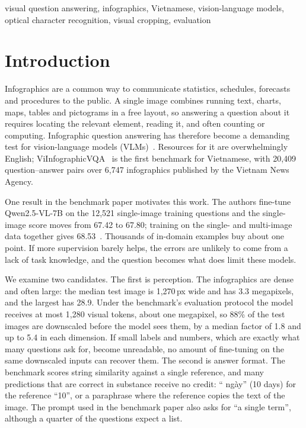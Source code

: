 \documentclass[conference]{IEEEtran}
\newcommand{\vi}[1]{{\fontencoding{T5}\selectfont #1}}
\newcommand{\vi}[1]{#1}
\newcommand{\MedianWidth}{1{,}270}
\newcommand{\MedianMP}{3.3}
\newcommand{\MedianDown}{1.8}
\begin{document}
\begin{IEEEkeywords}
visual question answering, infographics, Vietnamese, vision-language models, optical character recognition, visual cropping, evaluation
\end{IEEEkeywords}

\section{Introduction}
Infographics are a common way to communicate statistics, schedules, forecasts and procedures to the public. A single image combines running text, charts, maps, tables and pictograms in a free layout, so answering a question about it requires locating the relevant element, reading it, and often counting or computing. Infographic question answering has therefore become a demanding test for vision-language models (VLMs)~\cite{infographicvqa}. Resources for it are overwhelmingly English; ViInfographicVQA~\cite{viinfographicvqa} is the first benchmark for Vietnamese, with 20{,}409 question--answer pairs over 6{,}747 infographics published by the Vietnam News Agency.

One result in the benchmark paper motivates this work. The authors fine-tune Qwen2.5-VL-7B on the 12{,}521 single-image training questions and the single-image score moves from 67.42 to 67.80; training on the single- and multi-image data together gives 68.53~\cite{viinfographicvqa}. Thousands of in-domain examples buy about one point. If more supervision barely helps, the errors are unlikely to come from a lack of task knowledge, and the question becomes what does limit these models.

We examine two candidates. The first is perception. The infographics are dense and often large: the median test image is \MedianWidth{}\,px wide and has \MedianMP{} megapixels, and the largest has 28.9. Under the benchmark's evaluation protocol the model receives at most 1{,}280 visual tokens, about one megapixel, so 88\% of the test images are downscaled before the model sees them, by a median factor of \MedianDown{} and up to 5.4 in each dimension. If small labels and numbers, which are exactly what many questions ask for, become unreadable, no amount of fine-tuning on the same downscaled inputs can recover them. The second is answer format. The benchmark scores string similarity against a single reference, and many predictions that are correct in substance receive no credit: ``\vi{10 ngày}'' (10 days) for the reference ``10'', or a paraphrase where the reference copies the text of the image. The prompt used in the benchmark paper also asks for ``a single term'', although a quarter of the questions expect a list.
\end{document}
